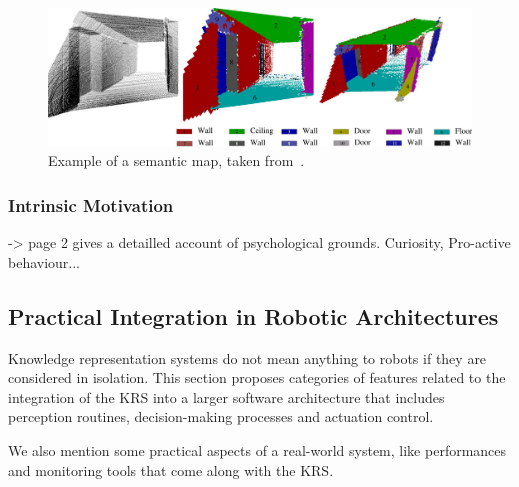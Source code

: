 \documentclass[a4paper, twocolumn]{article}
\begin{document}
\begin{figure}
    \centering
    \includegraphics[width=0.9\columnwidth]{semanticmaps_hertzberg.png}
    \caption{Example of a semantic map, taken from~\cite{Nuechter2008}.}
    \label{fig|semanticmap}
\end{figure}

\subsubsection{Intrinsic Motivation}

\cite{Oudeyer2007} -> page 2 gives a detailled account of psychological grounds.
Curiosity, Pro-active behaviour...


\subsection{Practical Integration in Robotic Architectures}
\label{sect|integration-robot}

\begin{scriptsize}
\begin{center}
\end{center}
\end{scriptsize}


Knowledge representation systems do not mean anything to robots if they are
considered in isolation. This section proposes categories of features related
to the integration of the KRS into a larger software architecture that includes
perception routines, decision-making processes and actuation control.

We also mention some practical aspects of a real-world system, like
performances and monitoring tools that come along with the KRS.
\end{document}
